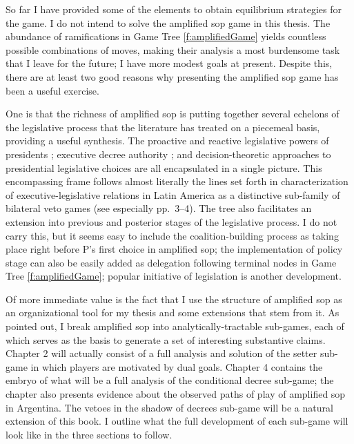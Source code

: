 So far I have provided some of the elements to obtain equilibrium strategies for the game.  I do not intend to solve the amplified sop game in this thesis.  The abundance of ramifications in Game Tree \ref{f:amplifiedGame} yields countless possible combinations of moves, making their analysis a most burdensome task that I leave for the future; I have more modest goals at present.  Despite this, there are at least two good reasons why presenting the amplified sop game has been a useful exercise.  

One is that the richness of amplified sop is putting together several echelons of the legislative process that the literature has treated on a piecemeal basis, providing a useful synthesis.  The proactive and reactive legislative powers of presidents \citep{mainwaring.shugart.1997a}; executive decree authority \citep{carey.shugart.1998,remington.etal.1998}; and decision-theoretic approaches to presidential legislative choices \citep[eg.][]{amorim.1998} are all encapsulated in a single picture.  This encompassing frame follows almost literally the lines set forth in \citet{cox.morgenstern.1998} characterization of executive-legislative relations in Latin America as a distinctive sub-family of bilateral veto games (see especially pp.\ 3--4).  The tree also facilitates an extension into previous and posterior stages of the legislative process.  I do not carry this, but it seems easy to include the coalition-building process \citep{amorim.1998,deheza.1997} as taking place right before P's first choice in amplified sop; the implementation of policy stage \citep{denhartog.2000,rosenblum.2000} can also be easily added as delegation following terminal nodes in Game Tree \ref{f:amplifiedGame}; popular initiative of legislation \citep{gerber.1996} is another development.  

Of more immediate value is the fact that I use the structure of amplified sop as an organizational tool for my thesis and some extensions that stem from it.  As pointed out, I break amplified sop into analytically-tractable sub-games, each of which serves as the basis to generate a set of interesting substantive claims.  Chapter 2 will actually consist of a full analysis and solution of the setter sub-game in which players are motivated by dual goals.  Chapter 4 contains the embryo of what will be a full analysis of the conditional decree sub-game; the chapter also presents evidence about the observed paths of play of amplified sop in Argentina.  The vetoes in the shadow of decrees sub-game will be a natural extension of this book.  I outline what the full development of each sub-game will look like in the three sections to follow.  

